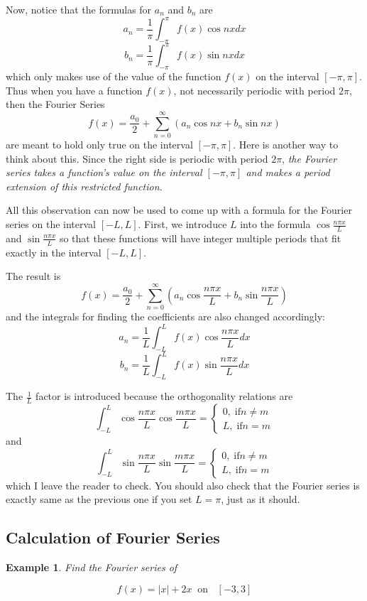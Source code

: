 \documentclass[12pt]{report}
\newtheorem{ex}{Example}[section]
\begin{document}
Now, notice that the formulas for $a_n$ and $b_n$ are
$$a_n = \frac{1}{\pi} \int_{-\pi}^{\pi} f(x) \cos nx dx$$
$$b_n = \frac{1}{\pi} \int_{-\pi}^{\pi} f(x) \sin nx dx$$
which only makes use of the value of the function $f(x)$ on the interval $[-\pi,\pi]$. Thus when you have a function $f(x)$, not necessarily periodic with period $2\pi$, then the Fourier Series
$$f(x) = \frac{a_0}{2} +\sum_{n=0}^{\infty} \left( a_n \cos nx + b_n \sin nx \right) $$
are meant to hold only true on the interval $[-\pi,\pi]$. Here is another way to think about this. Since the right side is periodic with period $2\pi$, \textit{the Fourier series takes a function's value on the interval $[-\pi,\pi]$ and makes a period extension of this restricted function.}

All this observation can now be used to come up with a formula for the Fourier series on the interval $[-L, L]$. First, we introduce $L$ into the formula  $\cos \frac{n \pi x}{L}$ and $\sin \frac{n\pi x}{L}$ so that these functions will have integer multiple periods that fit exactly in the interval $[-L, L]$.

The result is 
$$f(x) = \frac{a_0}{2} +\sum_{n=0}^{\infty} \left( a_n \cos \frac{n \pi x}{L} + b_n \sin \frac{n\pi x}{L} \right) $$
and the integrals for finding the coefficients are also changed accordingly:
$$a_n = \frac{1}{L} \int_{-L}^{L} f(x) \cos \frac{n\pi x }{L} dx$$
$$b_n = \frac{1}{L} \int_{-L}^{L} f(x) \sin \frac{n\pi x }{L} dx$$ 

The $\frac{1}{L}$ factor is introduced because the orthogonality relations are 
$$\int_{-L}^{L} \cos \frac{n\pi x}{L} \cos \frac{m\pi x }{L}  = \begin{cases} 0, \; \mathrm{ if } n \neq m \\ L, \; \mathrm{ if } n = m \end{cases} $$
and 
$$\int_{-L}^{L} \sin \frac{n\pi x}{L}  \sin \frac{m\pi x}{L}  = \begin{cases} 0, \; \mathrm{ if } n \neq m \\ L, \; \mathrm{ if } n = m \end{cases} $$
which I leave the reader to check. You should also check that the Fourier series is exactly same as the previous one if you set $L=\pi$, just as it should.

\subsection*{Calculation of Fourier Series}

\begin{ex}
	Find the Fourier series of 
	\end{ex}
	$$f(x) = |x| +2x \; \; \textrm{on } \; \; [-3,3]$$
\end{document}

